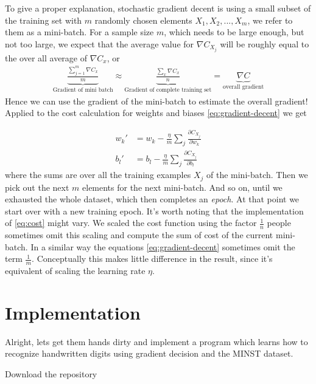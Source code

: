 \documentclass[10pt]{book}
\begin{document}
    To give a proper explanation, stochastic gradient decent is using a small subset of the training set with \(m\) randomly chosen elements \(X_1, X_2, ..., X_m\), we refer to them as a mini-batch. For a sample size
    \(m\), which needs to be large enough, but not too large, we expect that the average value for \(\nabla C_{X_j}\) will be roughly equal to the over all average of \(\nabla C_x\), or
    \begin{align}
        \underbrace{\frac{\sum_{j=1}^m \nabla C_x}{m}}_{\text{Gradient of mini batch}}
        \approx \underbrace{\frac{\sum_x \nabla C_x}{n}}_{\text{Gradient of complete training set}}
        = \underbrace{\nabla C}_{\text{overall gradient}}
    \end{align}
    Hence we can use the gradient of the mini-batch to estimate the overall gradient!
    Applied to the cost calculation for weights and biases \eqref{eq:gradient-decent} we get
    
    \begin{align}
        w_k' &= w_k - \frac{\eta}{m} \sum_j \frac{\partial C_{X_j}}{\partial w_k}\\
        b_l' &= b_l - \frac{\eta}{m} \sum_j \frac{\partial C_{X_j}}{\partial b_l}
    \end{align}
    where the sums are over all the training examples \(X_j\) of the mini-batch. Then we pick out the next \(m\)
    elements for the next mini-batch. And so on, until we exhausted the whole dataset, which then completes an \textit{epoch}.
    At that point we start over with a new training epoch.\newline
    It's worth noting that the implementation of \eqref{eq:cost} might vary. We scaled the cost function using the factor \(\frac{1}{n}\) people sometimes
    omit this scaling and compute the sum of cost of the current mini-batch. In a similar way the equations \eqref{eq:gradient-decent} sometimes omit the term \(\frac{1}{m}\).
    Conceptually this makes little difference in the result, since it's equivalent of scaling the learning rate \(\eta\).

    \section{Implementation}
    Alright, lets get them hands dirty and implement a program which learns how to recognize handwritten digits using gradient decision and the MINST dataset.
    
    Download the repository
\end{document}
